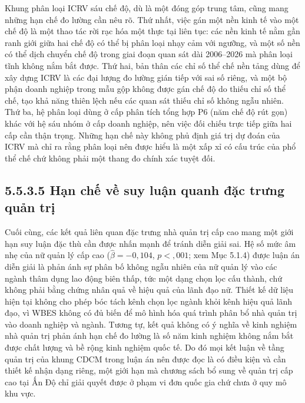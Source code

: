 \documentclass[
  a4paper,
  13pt]{extreport}
\begin{document}
Khung phân loại ICRV sáu chế độ, dù là một đóng góp trung tâm, cũng mang
những hạn chế đo lường cần nêu rõ. Thứ nhất, việc gán một nền kinh tế
vào một chế độ là một thao tác rời rạc hóa một thực tại liên tục: các
nền kinh tế nằm gần ranh giới giữa hai chế độ có thể bị phân loại nhạy
cảm với ngưỡng, và một số nền có thể dịch chuyển chế độ trong giai đoạn
quan sát dài 2006--2026 mà phân loại tĩnh không nắm bắt được. Thứ hai,
bản thân các chỉ số thể chế nền tảng dùng để xây dựng ICRV là các đại
lượng đo lường gián tiếp với sai số riêng, và một bộ phận doanh nghiệp
trong mẫu gộp không được gán chế độ do thiếu chỉ số thể chế, tạo khả
năng thiên lệch nếu các quan sát thiếu chỉ số không ngẫu nhiên. Thứ ba,
hệ phân loại dùng ở cấp phân tích tổng hợp P6 (năm chế độ rút gọn) khác
với hệ sáu nhóm ở cấp doanh nghiệp, nên việc đối chiếu trực tiếp giữa
hai cấp cần thận trọng. Những hạn chế này không phủ định giá trị dự đoán
của ICRV mà chỉ ra rằng phân loại nên được hiểu là một xấp xỉ có cấu
trúc của phổ thể chế chứ không phải một thang đo chính xác tuyệt đối.

\hypertarget{hux1ea1n-chux1ebf-vux1ec1-suy-luux1eadn-quanh-ux111ux1eb7c-trux1b0ng-quux1ea3n-trux1ecb}{%
\subsection{5.5.3.5 Hạn chế về suy luận quanh đặc trưng quản
trị}\label{hux1ea1n-chux1ebf-vux1ec1-suy-luux1eadn-quanh-ux111ux1eb7c-trux1b0ng-quux1ea3n-trux1ecb}}

Cuối cùng, các kết quả liên quan đặc trưng nhà quản trị cấp cao mang một
giới hạn suy luận đặc thù cần được nhấn mạnh để tránh diễn giải sai. Hệ
số mức âm nhẹ của nữ quản lý cấp cao (\(\hat{\beta} = -0{,}104\),
\(p < {,}001\); xem Mục 5.1.4) được luận án diễn giải là phản ánh sự
phân bố không ngẫu nhiên của nữ quản lý vào các ngành thâm dụng lao động
biên thấp, tức một dạng chọn lọc cấu thành, chứ không phải bằng chứng
nhân quả về hiệu quả của lãnh đạo nữ. Thiết kế dữ liệu hiện tại không
cho phép bóc tách kênh chọn lọc ngành khỏi kênh hiệu quả lãnh đạo, vì
WBES không có đủ biến để mô hình hóa quá trình phân bổ nhà quản trị vào
doanh nghiệp và ngành. Tương tự, kết quả không có ý nghĩa về kinh nghiệm
nhà quản trị phản ánh hạn chế đo lường là số năm kinh nghiệm không nắm
bắt được chất lượng và bề rộng kinh nghiệm quốc tế. Do đó mọi kết luận
về tầng quản trị của khung CDCM trong luận án nên được đọc là có điều
kiện và cần thiết kế nhận dạng riêng, một giới hạn mà chương sách bổ
sung về quản trị cấp cao tại Ấn Độ chỉ giải quyết được ở phạm vi đơn
quốc gia chứ chưa ở quy mô khu vực.
\end{document}
